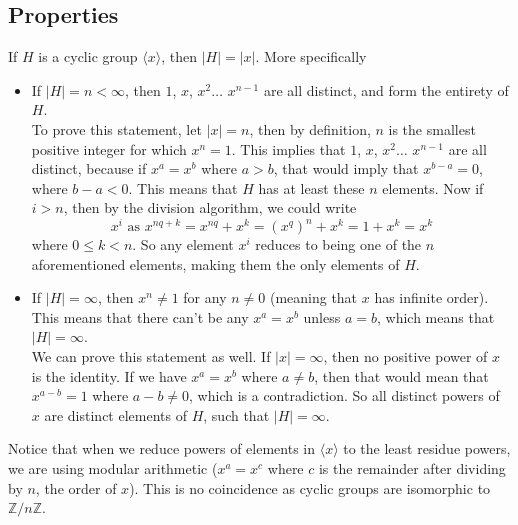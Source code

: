 \documentclass[12pt]{article}
\newcommand{\Z}{\mathbb{Z}}
\newcommand{\ang}[1]{\langle #1 \rangle}
\begin{document}
    \subsection*{Properties}

    If $H$ is a cyclic group $\ang{x}$,
    then $|H| = |x|$.
    More specifically
    \begin{itemize}[label=$\diamond$]
        \item 
            If $|H| = n < \infty$,
            then $1$, $x$, $x^2 \dots$ $x^{n-1}$ are all distinct,
            and form the entirety of $H$. \\
            To prove this statement,
            let $|x| = n$, then by definition,
            $n$ is the smallest positive integer for which $x^n = 1$.
            This implies that $1$, $x$, $x^2 \dots$ $x^{n-1}$
            are all distinct, because if $x^a = x^b$ where $a > b$,
            that would imply that $x^{b-a} = 0$,
            where $b-a < 0$. 
            This means that $H$ has at least these $n$ elements.
            Now if $i > n$, then by the division algorithm,
            we could write
            \[ x^i \text{ as } x^{nq + k} = x^{nq} + x^k = (x^q)^{n} + x^k 
            = 1 + x^k = x^k \]
            where $0 \leqslant k < n$.
            So any element $x^i$ reduces to being one of the $n$
            aforementioned elements, making them the only elements of $H$.
        \item 
            If $|H| = \infty$,
            then $x^n \neq 1$ for any $n \neq 0$
            (meaning that $x$ has infinite order).
            This means that there can't be any $x^a = x^b$
            unless $a = b$,
            which means that $|H| = \infty$. \\
            We can prove this statement as well.
            If $|x| = \infty$,
            then no positive power of $x$ is the identity.
            If we have $x^a = x^b$ where $a \neq b$,
            then that would mean that $x^{a-b} = 1$ where $a-b \neq 0$,
            which is a contradiction.
            So all distinct powers of $x$ are distinct elements of $H$,
            such that $|H| = \infty$.
    \end{itemize}
    
    Notice that when we reduce powers of elements in $\ang{x}$
    to the least residue powers, we are using modular arithmetic
    ($x^a = x^c$ where $c$ is the remainder after dividing by $n$,
    the order of $x$).
    This is no coincidence as
    cyclic groups are isomorphic to $\Z/n\Z$. \\
\end{document}
